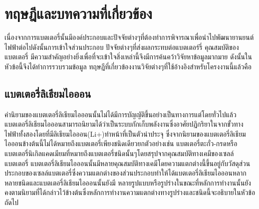 \chapter{ทฤษฎีและบทความที่เกี่ยวข้อง}
เนื่องจากการแบตเตอรี่นั้นมีองค์ประกอบและปัจจัยต่างๆที่ต้องทำการพิจารณาเพื่อนำไปพัฒนายานยนต์ไฟฟ้าต่อไปดังนั้นการเข้าใจส่วนประกอบ ปัจจัยต่างๆที่ส่งผลกระทบต่อแบตเตอร์รี่ คุณสมบัติของแบตเตอรี่ มีความสำคัญอย่างยิ่งเพื่อที่จะเข้าใจสิ่งเหล่านี้จึงมีการค้นคว้าวิจัยหาข้อมูลมากมาย ดังนั้นในหัวข้อนี้จึงได้ทำการรวบรวมข้อมูล ทฤษฎีที่เกี่ยวข้องงานวิจัยต่างๆที่ใช้อ้างอิงสำหรับโครงงานนี้แล้วคือ
\section{แบตเตอรี่ลิเธียมไอออน}
คำนิยามของแบตเตอรี่ลิเธียมไอออนนั้นไม่ได้มีการบัญญัติขึ้นอย่างเป็นทางการแต่โดยทั่วไปแล้วแบตเตอรี่ลิเธียมไอออนสามารถนิยามได้ว่าเป็นระบบกักเก็บพลังงานซึ่งอาศัยปฏิกริยาในจากขั้วทางไฟฟ้าทั้งสองโดยที่มีลิเธียมไอออน(Li+)ทำหน้าที่เป็นตัวนำประจุ ซึ่งจากนิยามของแบตเตอรี่ลิเธียมไอออนข้างต้นนี้ไม่ได้หมายถึงแบตเตอรี่เพียงชนิดเดียวยกตัวอย่างเช่น แบตเตอรี่ตะกั่ว-กรดหรือแบตเตอรี่นิเกิลแคดเมียมที่หมายถึงแบตเตอรี่ชนิดนั้นๆโดยสรุปจากคุณสมบัติทางเคมีของเซลล์แบตเตอรี่
\newline 
แบตเตอรี่ลิเธียมไอออนนั้นมีหลายคุณสมบัติทางเคมีโดยความแตกต่างนี้ขึ้นอยู่กับวัสดุส่วนประกอบของเซลล์แบตเตอรี่ซึ่งความแตกต่างของส่วนประกอบทำให้ได้แบตเตอรี่ลิเธียมไอออนหลากหลายชนิดและแบตเตอรี่ลิเธียมไอออนนั้นยังมี
หลายรูปแบบหรือรูปร่างในขณะที่หลักการทำงานนั้นยังคงตามนิยามที่ได้กล่าวไว้ข้างต้นซึ่งหลักการทำงานความแตกต่างทางรูปร่างและชนิดนี้จะอธิบายในหัวข้อถัดไป
